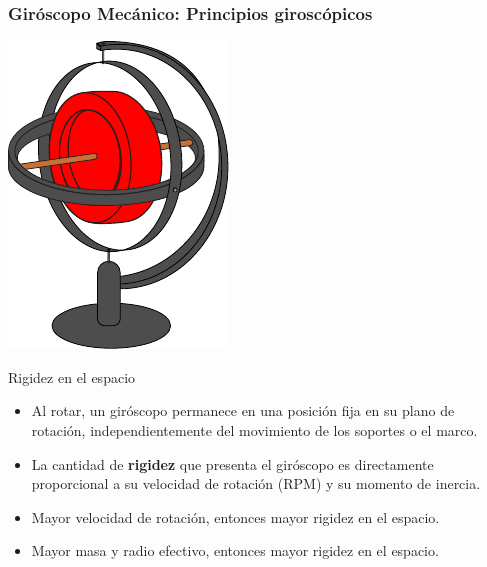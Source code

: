 \begin{frame}
    \frametitle{Giróscopo Mecánico: Principios giroscópicos}
    \scriptsize
    
    \begin{center}
        \hspace{1em}
        \includegraphics[width=0.15\columnwidth]{images/gyroscope.pdf}
    \end{center}

    \begin{block}{Rigidez en el espacio}
        \begin{itemize}
            \item Al rotar, un giróscopo permanece en una posición fija en su plano de rotación, independientemente del movimiento de los soportes o el marco.
            \item La cantidad de \textbf{rigidez} que presenta el giróscopo es directamente proporcional a su velocidad de rotación (RPM) y su momento de inercia.
            \item Mayor velocidad de rotación, entonces mayor rigidez en el espacio.
            \item Mayor masa y radio efectivo, entonces mayor rigidez en el espacio.
        \end{itemize}
    \end{block}

\end{frame}


